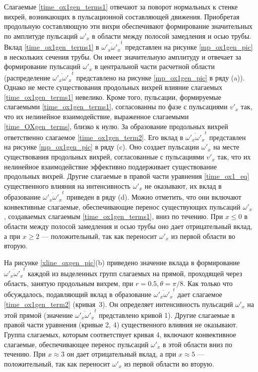 Слагаемые \eqref{time_ox1gen_terms1} отвечают за поворот нормальных к стенке вихрей, возникающих в пульсационной составляющей движения. Приобретая продольную составляющую эти вихри обеспечивают формирование значительных по амплитуде пульсаций $\omega'_x$ в области между полосой замедления и осью трубы. Вклад \eqref{time_ox1gen_terms1} в $\overline{\omega'_x \omega'_x}^t$ представлен на рисунке \ref{mp_ox1gen_pic} в нескольких сечения трубы. Он имеет значительную амплитуду и отвечает за формирование пульсаций $\omega'_x$ в центральной части расчетной области (распределение $\overline{\omega'_x \omega'_x}^t$ представлено на рисунке \ref{mp_ox1gen_pic} в ряду (a)). Однако не месте существования продольных вихрей влияние слагаемых \eqref{time_ox1gen_terms1} невелико. Кроме того, пульсации, формируемые слагаемыми \eqref{time_ox1gen_terms1}, согласованны по фазе с пульсациями $v'_x$ так, что их нелинейное взаимодействие, выраженное слагаемыми \eqref{time_OXgen_terms}, близко к нулю. За образование продольных вихрей ответственно слагаемое \eqref{time_ox1gen_term2}. Его вклад в $\overline{\omega'_x \omega'_x}^t$ представлен на рисунке \ref{mp_ox1gen_pic} в ряду (c). Оно создает пульсации $\omega'_x$ на месте существования продольных вихрей, согласованные с пульсациями $v'_x$ так, что их нелинейное взаимодействие эффективно поддерживает существование продольных вихрей. Другие слагаемые в правой части уравнения \eqref{time_ox1_eq} существенного влияния на интенсивность $\omega'_x$ не оказывают, их вклад в образование $\overline{\omega'_x \omega'_x}^t$ приведен в ряду (d). Можно отметить, что они включают конвективные слагаемые, обеспечивающие перенос существующих пульсаций $\omega'_x$, создаваемых слагаемым \eqref{time_ox1gen_terms1}, вниз по течению. При $x \le 0$ в области между полосой замедления и осью трубы оно дает отрицательный вклад, а при $x \ge 2$ --- положительный, так как переносит $\omega'_x$ из первой области во вторую.

На рисунке \ref{xline_oxgen_pic}(b) приведено значение вклада в формирование $\overline{\omega'_x \omega'_x}^t$ каждой из выделенных групп слагаемых на прямой, проходящей через область, занятую продольным вихрем, при $r = 0.5, \theta = \pi/8$. Как только что обсуждалось, подавляющий вклад в образование $\overline{\omega'_x \omega'_x}^t$  дает слагаемое \eqref{time_ox1gen_term2} (кривая~3). Он определяет интенсивность пульсаций $\omega'_x$ на этой прямой (значение $\overline{\omega'_x \omega'_x}^t$ представлено кривой 1). Другие слагаемые в правой части уравнения (кривые 2, 4) существенного влияния не оказывают. Группа слагаемых, которым соответствует кривая 4, включают конвективное слагаемые, обеспечивающее перенос пульсаций $\omega'_x$ в этой области вниз по течению. При $x \approx 3$ он дает отрицательный вклад, а при $x \approx 5$ --- положительный, так как переносит $\omega'_x$ из первой области во вторую. 

